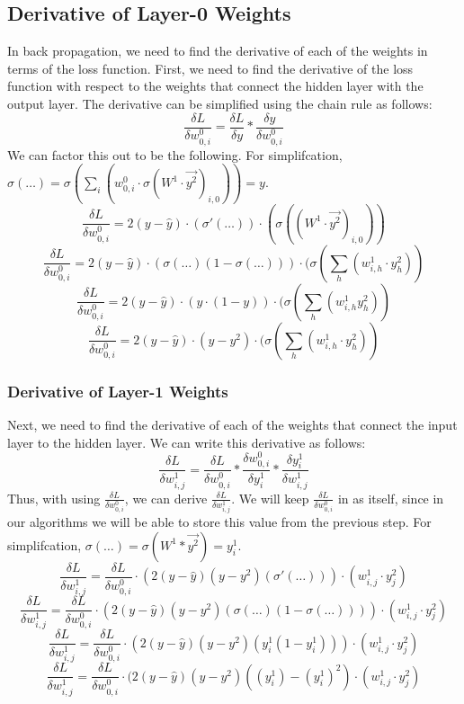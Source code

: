 \documentclass[10pt]{article}
\begin{document}
\subsection{Derivative of Layer-0 Weights}
In back propagation, we need to find the derivative of each of the weights in terms of the loss function. First, we need to find the derivative of the loss function with respect to the weights that connect the hidden layer with the output layer. The derivative can be simplified using the chain rule as follows:
$$\frac{\delta L}{\delta w^0_{0,i}} = \frac{\delta L}{\delta y} * \frac{\delta y}{\delta w^0_{0,i}}$$
We can factor this out to be the following. 
\newline
For simplifcation, $\sigma(\ldots) = \sigma(\sum_i{(w^0_{0,i} \cdot \sigma(W^1 \cdot \vec{y^2})_{i,0})}) = y$.
$$\frac{\delta L}{\delta w^0_{0,i}} = 2(y - \hat{y}) \cdot (\sigma'(\ldots)) \cdot (\sigma((W^1 \cdot \vec{y^2})_{i,0}))$$
$$\frac{\delta L}{\delta w^0_{0,i}} = 2(y - \hat{y}) \cdot (\sigma(\ldots)(1 - \sigma(\ldots))) \cdot (\sigma(\sum_h{(w^1_{i,h} \cdot y^2_{h})})$$
$$\frac{\delta L}{\delta w^0_{0,i}} = 2(y - \hat{y}) \cdot (y \cdot (1 - y)) \cdot (\sigma(\sum_h{(w^1_{i,h} y^2_{h})})$$
$$\frac{\delta L}{\delta w^0_{0,i}} = 2(y - \hat{y}) \cdot (y - y^2) \cdot  (\sigma(\sum_h^{}{(w^1_{i,h} \cdot y^2_{h})})$$

\subsubsection{Derivative of Layer-1 Weights}
Next, we need to find the derivative of each of the weights that connect the input layer to the hidden layer. We can write this derivative as follows:
$$\frac{\delta L}{\delta w^1_{i,j}} = \frac{\delta L}{\delta w^0_{0,i}} * \frac{\delta w^0_{0,i}}{\delta y^1_i} * \frac{\delta y^1_i}{\delta w^1_{i,j}}$$
Thus, with using $\frac{\delta L}{\delta w^0_{0,i}}$, we can derive $\frac{\delta L}{\delta w^1_{i,j}}$. We will keep $\frac{\delta L}{\delta w^0_{0,i}}$ in as itself, since in our algorithms we will be able to store this value from the previous step.
\newline
For simplifcation, $\sigma(\ldots) = \sigma(W^1 * \vec{y^2}) = y^1_i$.
$$\frac{\delta L}{\delta w^1_{i,j}} = \frac{\delta L}{\delta w^0_{0,i}} \cdot (2(y-\hat{y})(y - y^2)(\sigma'(\ldots))) \cdot (w^1_{i,j} \cdot y^2_{j})$$
$$\frac{\delta L}{\delta w^1_{i,j}} = \frac{\delta L}{\delta w^0_{0,i} } \cdot (2(y - \hat{y})(y - y^2)(\sigma(\ldots)(1 - \sigma(\ldots)))) \cdot (w^1_{i,j} \cdot y^2_{j})$$
$$\frac{\delta L}{\delta w^1_{i,j}} = \frac{\delta L}{\delta w^0_{0,i}} \cdot (2(y - \hat{y})(y - y^2)(y^1_i (1 - y^1_i))) \cdot (w^1_{i,j} \cdot y^2_{j})$$
$$\frac{\delta L}{\delta w^1_{i,j}} = \frac{\delta L}{\delta w^0_{0,i}} \cdot (2(y - \hat{y})(y - y^2)((y^1_i) - (y^1_i)^2) \cdot (w^1_{i,j} \cdot y^2_{j})$$
\end{document}
